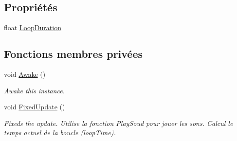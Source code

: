 \subsection*{Propriétés}
\begin{DoxyCompactItemize}
\item 
float \hyperlink{class_loop_a50eeceb1774c7d9bb78f0b1c545010d2}{Loop\+Duration}
\end{DoxyCompactItemize}
\subsection*{Fonctions membres privées}
\begin{DoxyCompactItemize}
\item 
void \hyperlink{class_loop_a9eeb1aa2e5cb39a0f3051b7dc8fc4fc2}{Awake} ()
\begin{DoxyCompactList}\small\item\em Awake this instance. \end{DoxyCompactList}\item 
void \hyperlink{class_loop_ae9848ead9ef01735696c2d954c1356ef}{Fixed\+Update} ()
\begin{DoxyCompactList}\small\item\em Fixeds the update. Utilise la fonction Play\+Soud pour jouer les sons. Calcul le temps actuel de la boucle (loop\+Time). \end{DoxyCompactList}\end{DoxyCompactItemize}
